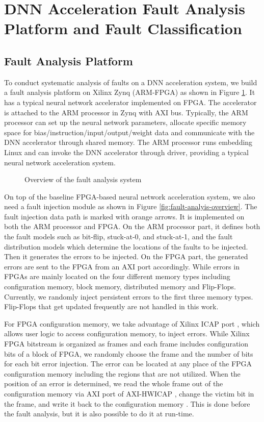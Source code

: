 \section{DNN Acceleration Fault Analysis Platform and Fault Classification}
\label{sec:fault-analysis}
\subsection{Fault Analysis Platform}
To conduct systematic analysis of faults on a DNN acceleration 
system, we build a fault analysis platform on Xilinx Zynq (ARM-FPGA) 
as shown in Figure \ref{fig:fault-analysis-overview}. It has a 
typical neural network accelerator implemented on FPGA. The accelerator 
is attached to the ARM processor in Zynq with AXI bus. Typically, the ARM processor 
can set up the neural network parameters, allocate specific memory 
space for bias/instruction/input/output/weight data 
and communicate with the DNN accelerator through shared memory. 
The ARM processor runs embedding Linux and can invoke the 
DNN accelerator through driver, providing a typical neural 
network acceleration system.

\begin{figure}
    \caption{Overview of the fault analysis system}
\vspace{-0.5em}
\label{fig:fault-analysis-overview}
\end{figure}

On top of the baseline FPGA-based neural network acceleration system, 
we also need a fault injection module as shown in 
Figure \ref{fig:fault-analyis-overview}. The fault injection data path 
is marked with orange arrows. It is implemented on both the ARM processor 
and FPGA. On the ARM processor part, it defines both the fault models 
such as bit-flip, stuck-at-0, and stuck-at-1, and the fault distribution 
models which determine the locations of the faults to be injected. Then it
generates the errors to be injected. On the FPGA part, the generated errors 
are sent to the FPGA from an AXI port accordingly. While errors in FPGAs are mainly 
located on the four different memory types including configuration memory, 
block memory, distributed memory and Flip-Flops. Currently, we randomly 
inject persistent errors to the first three memory types. Flip-Flops that 
get updated frequently are not handled in this work. 

For FPGA configuration memory, we take advantage of Xilinx ICAP 
port \cite{UG953}, which allows user logic to access configuration 
memory, to inject errors. While Xilinx FPGA bitstream is organized 
as frames and each frame includes configuration bits of a block of 
FPGA, we randomly choose the frame and the number of bits for each 
bit error injection. The error can be located at any place of the 
FPGA configuration memory including the regions that are not utilized.
When the position of an error is determined, we read the whole frame 
out of the configuration memory via AXI port of AXI-HWICAP \cite{PG134}, 
change the victim bit in the frame, and write it back to the configuration 
memory \cite{UG470}. This is done before the fault analysis, but it is also 
possible to do it at run-time.

